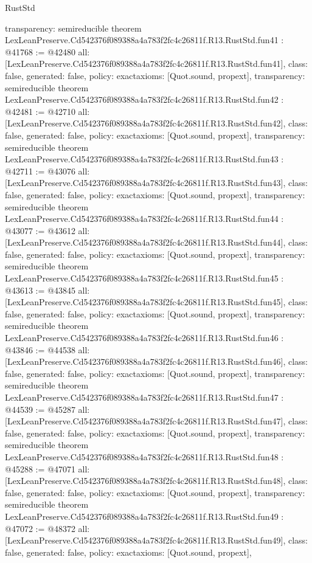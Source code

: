 \begin{lexlean}{RustStd}
\begin{coremodule}
{  transparency: semireducible
}
theorem LexLeanPreserve.Cd542376f089388a4a783f2fc4c26811f.R13.RustStd.fun41 : @41768 := @42480 {
  all: [LexLeanPreserve.Cd542376f089388a4a783f2fc4c26811f.R13.RustStd.fun41],
  class: false,
  generated: false,
  policy: exact{axioms: [Quot.sound, propext]},
  transparency: semireducible
}
theorem LexLeanPreserve.Cd542376f089388a4a783f2fc4c26811f.R13.RustStd.fun42 : @42481 := @42710 {
  all: [LexLeanPreserve.Cd542376f089388a4a783f2fc4c26811f.R13.RustStd.fun42],
  class: false,
  generated: false,
  policy: exact{axioms: [Quot.sound, propext]},
  transparency: semireducible
}
theorem LexLeanPreserve.Cd542376f089388a4a783f2fc4c26811f.R13.RustStd.fun43 : @42711 := @43076 {
  all: [LexLeanPreserve.Cd542376f089388a4a783f2fc4c26811f.R13.RustStd.fun43],
  class: false,
  generated: false,
  policy: exact{axioms: [Quot.sound, propext]},
  transparency: semireducible
}
theorem LexLeanPreserve.Cd542376f089388a4a783f2fc4c26811f.R13.RustStd.fun44 : @43077 := @43612 {
  all: [LexLeanPreserve.Cd542376f089388a4a783f2fc4c26811f.R13.RustStd.fun44],
  class: false,
  generated: false,
  policy: exact{axioms: [Quot.sound, propext]},
  transparency: semireducible
}
theorem LexLeanPreserve.Cd542376f089388a4a783f2fc4c26811f.R13.RustStd.fun45 : @43613 := @43845 {
  all: [LexLeanPreserve.Cd542376f089388a4a783f2fc4c26811f.R13.RustStd.fun45],
  class: false,
  generated: false,
  policy: exact{axioms: [Quot.sound, propext]},
  transparency: semireducible
}
theorem LexLeanPreserve.Cd542376f089388a4a783f2fc4c26811f.R13.RustStd.fun46 : @43846 := @44538 {
  all: [LexLeanPreserve.Cd542376f089388a4a783f2fc4c26811f.R13.RustStd.fun46],
  class: false,
  generated: false,
  policy: exact{axioms: [Quot.sound, propext]},
  transparency: semireducible
}
theorem LexLeanPreserve.Cd542376f089388a4a783f2fc4c26811f.R13.RustStd.fun47 : @44539 := @45287 {
  all: [LexLeanPreserve.Cd542376f089388a4a783f2fc4c26811f.R13.RustStd.fun47],
  class: false,
  generated: false,
  policy: exact{axioms: [Quot.sound, propext]},
  transparency: semireducible
}
theorem LexLeanPreserve.Cd542376f089388a4a783f2fc4c26811f.R13.RustStd.fun48 : @45288 := @47071 {
  all: [LexLeanPreserve.Cd542376f089388a4a783f2fc4c26811f.R13.RustStd.fun48],
  class: false,
  generated: false,
  policy: exact{axioms: [Quot.sound, propext]},
  transparency: semireducible
}
theorem LexLeanPreserve.Cd542376f089388a4a783f2fc4c26811f.R13.RustStd.fun49 : @47072 := @48372 {
  all: [LexLeanPreserve.Cd542376f089388a4a783f2fc4c26811f.R13.RustStd.fun49],
  class: false,
  generated: false,
  policy: exact{axioms: [Quot.sound, propext]},
}
\end{coremodule}
\end{lexlean}

